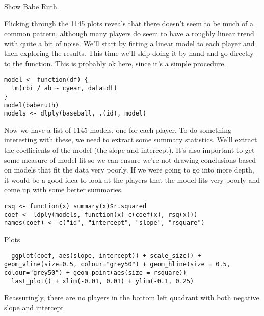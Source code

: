 \documentclass[letterpaper,oneside]{scrartcl}
\begin{document}
Show Babe Ruth.  

Flicking through the 1145 plots reveals that there doesn't seem to be much of a common pattern, although many players do seem to have a roughly linear trend with quite a bit of noise.  We'll start by fitting a linear model to each player and then exploring the results.  This time we'll skip doing it by hand and go directly to the function.  This is probably ok here, since it's a simple procedure.

\begin{verbatim}
model <- function(df) {
  lm(rbi / ab ~ cyear, data=df)
}
model(baberuth)
models <- dlply(baseball, .(id), model)
\end{verbatim}

Now we have a list of 1145 models, one for each player.  To do something interesting with these, we need to extract some summary statistics.  We'll extract the coefficients of the model (the slope and intercept).  It's also important to get some measure of model fit so we can ensure we're not drawing conclusions based on models that fit the data very poorly.  If we were going to go into more depth, it would be a good idea to look at the players that the model fits very poorly and come up with some better summaries.

\begin{verbatim}
rsq <- function(x) summary(x)$r.squared
coef <- ldply(models, function(x) c(coef(x), rsq(x)))
names(coef) <- c("id", "intercept", "slope", "rsquare")
\end{verbatim}

Plots

\begin{verbatim}
  ggplot(coef, aes(slope, intercept)) + scale_size() + geom_vline(size=0.5, colour="grey50") + geom_hline(size = 0.5, colour="grey50") + geom_point(aes(size = rsquare))
  last_plot() + xlim(-0.01, 0.01) + ylim(-0.1, 0.25)
\end{verbatim}

Reassuringly, there are no players in the bottom left quadrant with both negative slope and intercept

% 
% 
% 
\end{document}
